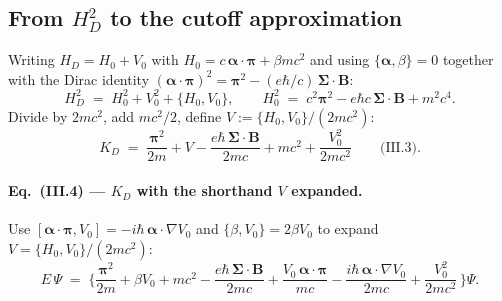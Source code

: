\subsection{From $H_D^2$ to the cutoff approximation}

Writing $H_D = H_0 + V_0$ with $H_0 = c\,\boldsymbol\alpha\!\cdot\!\boldsymbol\pi
+ \beta m c^2$ and using $\{\boldsymbol\alpha, \beta\} = 0$ together with the
Dirac identity
$(\boldsymbol\alpha\!\cdot\!\boldsymbol\pi)^2 = \boldsymbol\pi^2
- (e\hbar/c)\,\boldsymbol\Sigma\!\cdot\!\mathbf{B}$:
\begin{equation}
H_D^2 \;=\; H_0^2 + V_0^2 + \{H_0, V_0\},\qquad
H_0^2 \;=\; c^2 \boldsymbol\pi^2 - e \hbar c\,\boldsymbol\Sigma\!\cdot\!\mathbf{B}
+ m^2 c^4.
\end{equation}
Divide by $2 m c^2$, add $m c^2/2$, define
$V := \{H_0, V_0\}/(2 m c^2)$:
\begin{equation}
\label{eq:III3-KD}
K_D \;=\; \frac{\boldsymbol\pi^2}{2 m}
        + V
        - \frac{e\hbar\,\boldsymbol\Sigma\!\cdot\!\mathbf{B}}{2 m c}
        + m c^2
        + \frac{V_0^2}{2 m c^2}\qquad\text{(III.3).}
\end{equation}

\paragraph{Eq.~(III.4) --- $K_D$ with the shorthand $V$ expanded.}
Use $[\boldsymbol\alpha\!\cdot\!\boldsymbol\pi, V_0] = -i\hbar\,\boldsymbol\alpha\!\cdot\!\nabla V_0$
and $\{\beta, V_0\} = 2\beta V_0$ to expand
$V = \{H_0, V_0\}/(2 m c^2)$:
\begin{equation}
\label{eq:III4}
E\,\Psi \;=\; \Bigg\{
   \frac{\boldsymbol\pi^2}{2 m}
 + \beta V_0
 + m c^2
 - \frac{e\hbar\,\boldsymbol\Sigma\!\cdot\!\mathbf{B}}{2 m c}
 + \frac{V_0\,\boldsymbol\alpha\!\cdot\!\boldsymbol\pi}{m c}
 - \frac{i\hbar\,\boldsymbol\alpha\!\cdot\!\nabla V_0}{2 m c}
 + \frac{V_0^2}{2 m c^2}\,
\Bigg\}\Psi.
\end{equation}


